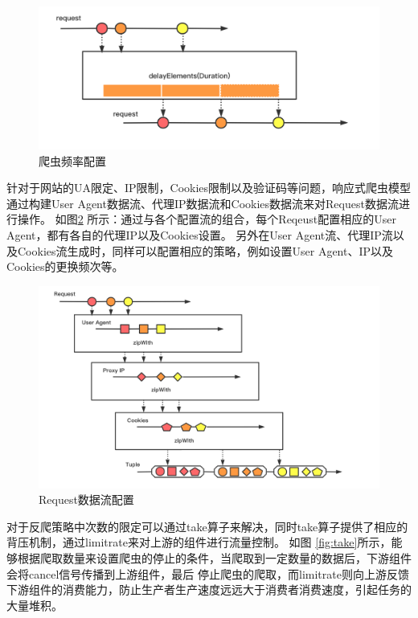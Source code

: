 \documentclass[master]{njuthesis}
\begin{document}
\begin{figure}[htbp]
\centering
\includegraphics[width= 1\textwidth]{pic/delay.png}
\caption{爬虫频率配置}\label{fig:delay}
\end{figure}

针对于网站的UA限定、IP限制，Cookies限制以及验证码等问题，响应式爬虫模型通过构建User Agent数据流、代理IP数据流和Cookies数据流来对Request数据流进行操作。
如图\ref{fig:zip} 所示：通过与各个配置流的组合，每个Reqeust配置相应的User Agent，都有各自的代理IP以及Cookies设置。
另外在User Agent流、代理IP流以及Cookies流生成时，同样可以配置相应的策略，例如设置User Agent、IP以及Cookies的更换频次等。

\begin{figure}[htbp]
\centering
\includegraphics[width= 1\textwidth]{pic/reactive-zip.png}
\caption{Request数据流配置}\label{fig:zip}
\end{figure}


对于反爬策略中次数的限定可以通过take算子来解决，同时take算子提供了相应的背压机制，通过limitrate来对上游的组件进行流量控制。
如图 \ref{fig:take}所示，能够根据爬取数量来设置爬虫的停止的条件，当爬取到一定数量的数据后，下游组件会将cancel信号传播到上游组件，最后
停止爬虫的爬取，而limitrate则向上游反馈下游组件的消费能力，防止生产者生产速度远远大于消费者消费速度，引起任务的大量堆积。
\end{document}
